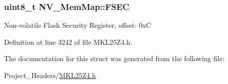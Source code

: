 \subsubsection[{\texorpdfstring{F\+S\+EC}{FSEC}}]{\setlength{\rightskip}{0pt plus 5cm}uint8\+\_\+t N\+V\+\_\+\+Mem\+Map\+::\+F\+S\+EC}\hypertarget{struct_n_v___mem_map_acb89fbc884fb10887ef063d1aa892b29}{}\label{struct_n_v___mem_map_acb89fbc884fb10887ef063d1aa892b29}
Non-\/volatile Flash Security Register, offset\+: 0xC 

Definition at line 3242 of file M\+K\+L25\+Z4.\+h.



The documentation for this struct was generated from the following file\+:\begin{DoxyCompactItemize}
\item 
Project\+\_\+\+Headers/\hyperlink{_m_k_l25_z4_8h}{M\+K\+L25\+Z4.\+h}\end{DoxyCompactItemize}
